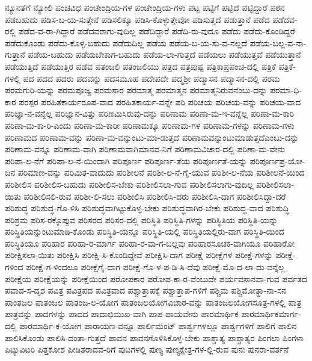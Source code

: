 {ನ್ಯೂನತೆಗೆ
ನ್ಯೋಲಿ
ಪಂಚವಿಧ
ಪಂಚೇಂದ್ರಿಯ-ಗಳ
ಪಂಚೇಂದ್ರಿಯ-ಗಳು
ಪಟ್ಟ
ಪಟ್ಟಿಗೆ
ಪಟ್ಟಿದೆ
ಪಟ್ಟಿದ್ದಾರೆ
ಪಠನ
ಪಡಬಹುದು
ಪಡಿಸ-ಬ-ಯ-ಸುತ್ತೇನೆ
ಪಡಿಸಲಿಕ್ಕೂ
ಪಡಿಸಿ-ಕೊಳ್ಳುತ್ತೇವೋ
ಪಡಿಸುತ್ತದೆ
ಪಡುತ್ತಾನೆ
ಪಡೆದ
ಪಡೆದವ-ರಲ್ಲಿ
ಪಡೆದ-ವ-ರಾ-ಗಿದ್ದಾರೆ
ಪಡೆದವರಾಗು-ವುದಿಲ್ಲ
ಪಡೆದಿದ್ದಾರೆ
ಪಡೆದಿ-ರು-ವುದೂ
ಪಡೆದು
ಪಡೆದು-ಕೊಂಡಿದ್ದರೆ
ಪಡೆದುಕೊಂಡು
ಪಡೆದು-ಕೊಳ್ಳ-ಬಹುದು
ಪಡೆದುದಿಲ್ಲ
ಪಡೆಯ
ಪಡೆಯ-ಬ-ಯ-ಸು-ವ-ನಲ್ಲದೆ
ಪಡೆಯ-ಬಲ್ಲ-ವ-ನಾ-ಗುತ್ತಾನೆ
ಪಡೆಯ-ಬಹುದು
ಪಡೆಯಬೇಕಾಗ-ಬಹುದು
ಪಡೆಯ-ಲಾ-ಗುತ್ತದೆ
ಪಡೆಯಲು
ಪಡೆಯುತ್ತವೆ
ಪಡೆಯುತ್ತಾನೆ
ಪಡೆಯುತ್ತಿದೆ
ಪಡೆಯುತ್ತಿರ
ಪಡೆವ
ಪತಂಜಲಿ
ಪತಂಜಲಿಯು
ಪತ್ರದ
ಪತ್ರಪುಷ್ಪ
ಪತ್ರಿಕಾಪ್ರಪಂಚ-ದಲ್ಲಿ
ಪತ್ರಿಕೆ
ಪತ್ರಿಕೆ-ಗಳಲ್ಲಿ
ಪದ
ಪದದ
ಪದರು
ಪದವನ್ನು
ಪದಸಮೂಹ
ಪದೇಪದೇ
ಪದ್ಮಶ್ರೀ
ಪದ್ಮಾಸನ
ಪದ್ಮಾಸನ-ದಲ್ಲಿ
ಪರಮ
ಪರಮಗುರಿ-ಯನ್ನು
ಪರಮಪೂಜ್ಯ
ಪರಮಸಾರ
ಪರಮಾತ್ಮ
ಪರಮಾತ್ಮನ
ಪರಮಾತ್ಮನಿರುವನೆಂಬು-ದನ್ನು
ಪರಮಾ-ಧಿ-ಕಾರ
ಪರಸ್ಪರ
ಪರಹಿತಕಾರ್ಯರೂಪ-ವಾದ
ಪರಹಿತಕಾರ್ಯ-ವನ್ನೇ
ಪರಿ
ಪರಿಚಯ
ಪರಿಚಯ-ವನ್ನು
ಪರಿಚಯ-ವಾದ
ಪರಿಜ್ಞಾ-ನ-ವನ್ನೆಲ್ಲ
ಪರಿಜ್ಞಾನ-ವಿತ್ತು
ಪರಿಣಮಿಸಿರುವು-ದನ್ನು
ಪರಿಣಾಮ
ಪರಿಣಾ-ಮ-ಇ-ವನ್ನೆಲ್ಲ
ಪರಿಣಾ-ಮ-ಕಾರಿ
ಪರಿಣಾ-ಮ-ಕಾ-ರಿ-ಎಂದು
ಪರಿಣಾ-ಮ-ಕಾರೀ
ಪರಿಣಾಮಕ್ಕೂ
ಪರಿಣಾಮ-ಗಳ
ಪರಿಣಾಮ-ಗಳನ್ನು
ಪರಿಣಾಮ-ಗಳು
ಪರಿಣಾಮದ
ಪರಿಣಾಮ-ವನ್ನು
ಪರಿಣಾ-ಮ-ವನ್ನುಂಟು-ಮಾ-ಡುತ್ತದೆ
ಪರಿಣಾಮವನ್ನುಂಟುಮಾಡುತ್ತದೆಎಂಬು-ದನ್ನು
ಪರಿಣಾಮ-ವನ್ನೂ
ಪರಿಣಾಮ-ವಾಗಿ
ಪರಿಣಾಮವಾಗಿಮಾನವ-ನಿಗೆ
ಪರಿಣಾಮವಿಚಾರ-ದಲ್ಲಿ
ಪರಿಣಾ-ಮ-ವೇನು
ಪರಿಪಾ-ಲ-ನೆಗೆ
ಪರಿಪಾ-ಲ-ನೆ-ಯಿಂದಾಗಿ
ಪರಿಪೂರ್ಣ
ಪರಿಪೂರ್ಣ-ತೆಯ
ಪರಿಪೂರ್ಣತೆ-ಯನ್ನು
ಪರಿಪೂರ್ಣಪ್ರ-ಯೋ-ಜನ
ಪರಿಮಾಣ-ವನ್ನು
ಪರಿಮಿತ-ವಾದುದು
ಪರಿಶೀಲನೆ
ಪರಿಶೀ-ಲ-ನೆ-ಗೈ-ಯುವ
ಪರಿಶೀ-ಲ-ನೆಯ
ಪರಿಶೀಲನೆ-ಯಿಂದ
ಪರಿಶೀಲಿಸ
ಪರಿಶೀಲಿಸ-ಬಹುದು
ಪರಿಶೀಲಿಸ-ಬೇಕು
ಪರಿಶೀಲಿಸಲಾ-ಗುವ
ಪರಿಶೀಲಿಸಲಾಗು-ವುದಿಲ್ಲ
ಪರಿಶೀಲಿಸಲಾ-ಯಿತು
ಪರಿಶೀಲಿಸಲಿ-ರುವ
ಪರಿಶೀ-ಲಿ-ಸಲು
ಪರಿಶೀಲಿಸಿ
ಪರಿಶೀಲಿಸಿ-ದರು
ಪರಿಶೀಲಿಸಿ-ದಾಗ
ಪರಿಶೀಲಿಸಿದ್ದಾ-ದರೆ
ಪರಿಶುದ್ಧ
ಪರಿಶುದ್ಧ-ಗೊ-ಳಿಸಿ
ಪರಿಶುದ್ಧವಾಗಿಟ್ಟುಕೊಳ್ಳ-ಬೇಕು
ಪರಿಶುದ್ಧವಾಗಿರ-ಬೇಕು
ಪರಿಶುದ್ಧ-ವಾದ
ಪರಿಶುದ್ಧಿ
ಪರಿಶ್ರಮ
ಪರಿಸ-ರಕ್ಕೊಪ್ಪುವ
ಪರಿಸರದ
ಪರಿಸರ-ದಲ್ಲಿ
ಪರಿಸ್ಥಿತಿ
ಪರಿಸ್ಥಿತಿ-ಗಳನ್ನು
ಪರಿಸ್ಥಿತಿಯ
ಪರಿಸ್ಥಿತಿ-ಯನ್ನು
ಪರಿಸ್ಥಿತಿಯನ್ನುಂಟುಮಾಡಿ-ಕೊಂಡು
ಪರಿಸ್ಥಿತಿ-ಯನ್ನೂ
ಪರಿಸ್ಥಿತಿ-ಯಲ್ಲಿ
ಪರಿಸ್ಥಿತಿಯಲ್ಲಿರು-ವಾಗ
ಪರಿಸ್ಥಿತಿ-ಯಿಂದ
ಪರಿಸ್ಥಿತಿಯೂ
ಪರಿಹಾರ
ಪರಿಹಾ-ರ-ಮಾರ್ಗ
ಪರಿಹಾ-ರ-ವಾ-ಗ-ಬಲ್ಲವು
ಪರಿಹಾರಸೂಚಕ-ವಾಗಿಯೂ
ಪರಿಹಾರೋ
ಪರೀಕ್ಷಿಸಲಾ-ಯಿತು
ಪರೀಕ್ಷಿಸಿ
ಪರೀಕ್ಷಿ-ಸಿ-ಕೊಂಡಿದ್ದೇವೆ
ಪರೀಕ್ಷಿಸಿ-ದಾಗ
ಪರೀಕ್ಷೆ
ಪರೀಕ್ಷೆಗಳ
ಪರೀಕ್ಷೆ-ಗಳನ್ನು
ಪರೀಕ್ಷೆ-ಗಳಿಂದ
ಪರೀಕ್ಷೆ-ಗ-ಳಿಂದಲೂ
ಪರೀಕ್ಷೆಗೈ-ದಾಗ
ಪರೀಕ್ಷೆ-ಗೊ-ಳ-ಪ-ಡಿ-ಸಿ-ದೆವು
ಪರೀಕ್ಷೆ-ಮೊ-ದ-ಲಾ-ದು-ವನ್ನೆಲ್ಲ
ಪರೀಕ್ಷೆಯ
ಪರೀಕ್ಷೆಯನ್ನು
ಪರೀಕ್ಷೆಯಿಂದ
ಪರೋಪಕಾರ
ಪರೋಪ-ಕಾ-ರ-ವೆಂಬುದೇ
ಪರ್ಯವಸಾನವಾ-ಗುವ
ಪರ್ವತದ
ಪವಾಡ-ಸ-ದೃಶ
ಪವಿತ್ರ
ಪವಿತ್ರಪದ
ಪವಿತ್ರವಾದ
ಪಶ್ಚಾತ್ತಾಪಕ್ಕೆ
ಪಶ್ಚಾತ್ತಾಪ-ಗಳಿಗೆ
ಪಶ್ಚಿಮ
ಪಶ್ಚಿಮೋತ್ಥಾ-ನಾ-ಸನ
ಪಾಂತಜಲ
ಪಾತಂಜಲ
ಪಾತಂಜ-ಲ-ಯೋಗ
ಪಾತಂಜಲಯೋಗವಿಚಾರ-ವನ್ನು
ಪಾತಂಜಲಯೋಗಸೂತ್ರ-ಗಳಲ್ಲಿ
ಪಾತ್ರ
ಪಾತ್ರವನ್ನು
ಪಾದಗಳನ್ನು
ಪಾದದ
ಪಾದಾಭಿಮುಖ-ವಾಗಿ
ಪಾಪ
ಪಾಯವೇನು
ಪಾರಮಾರ್ಥಿಕ
ಪಾರಮಾರ್ಥಿಕಮಾರ್ಗ-ದಲ್ಲಿ
ಪಾರಮಾರ್ಥಿ-ಕ-ಯೋಗ
ಪಾರಾಯಣ-ವನ್ನೂ
ಪಾರ್ಲಿಮೆಂಟ್
ಪಾರ್ಶ್ವಗಳಲ್ಲೂ
ಪಾರ್ಶ್ವಗಳಿಗೆ
ಪಾಲಿಗೆ
ಪಾಲಿನ
ಪಾಲಿಸಿಕೊಂಡು
ಪಾಲಿಸಿ-ದಂತಾ-ಗುತ್ತದೆ
ಪಾವನ
ಪಾವನಗೊಳಿಸಿಕೊಳ್ಳ-ಬೇಕು
ಪಾಶ್ಚಾತ್ಯ
ಪಾಶ್ಚಾತ್ಯರ
ಪಿಂಗಲಾ
ಪಿಂಗಳಾ
ಪಿಟ್ಯುವಿಟರಿ
ಪಿತ್ತಕೋಶ
ಪೀಡಿತರಾದವ-ರಿಗೆ
ಪುಟಗಳಲ್ಲಿ
ಪುಣ್ಯ
ಪುಣ್ಯಕ್ಷೇತ್ರ-ಗಳ-ಲ್ಲಿ-ರುವ
ಪುನಃ
ಪುನರಾ-ವರ್ತನೆ
}
